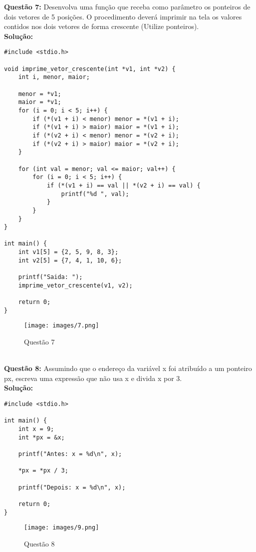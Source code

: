 \documentclass[12pt]{article}
\begin{document}
\textbf{Questão 7:} Desenvolva uma função que receba como parâmetro os ponteiros de
dois vetores de 5 posições. O procedimento deverá imprimir na tela os
valores contidos nos dois vetores de forma crescente (Utilize ponteiros).
\\

\noindent\textbf{Solução:}
\begin{lstlisting}[style=c]
#include <stdio.h>

void imprime_vetor_crescente(int *v1, int *v2) {
    int i, menor, maior;

    menor = *v1;
    maior = *v1;
    for (i = 0; i < 5; i++) {
        if (*(v1 + i) < menor) menor = *(v1 + i);
        if (*(v1 + i) > maior) maior = *(v1 + i);
        if (*(v2 + i) < menor) menor = *(v2 + i);
        if (*(v2 + i) > maior) maior = *(v2 + i);
    }

    for (int val = menor; val <= maior; val++) {
        for (i = 0; i < 5; i++) {
            if (*(v1 + i) == val || *(v2 + i) == val) {
                printf("%d ", val);
            }
        }
    }
}

int main() {
    int v1[5] = {2, 5, 9, 8, 3};
    int v2[5] = {7, 4, 1, 10, 6};

    printf("Saida: ");
    imprime_vetor_crescente(v1, v2);

    return 0;
}
\end{lstlisting}

\begin{figure}[h]
    \centering
    \texttt{[image: images/7.png]}
    \caption{Questão 7}
\end{figure}
\\

\textbf{Questão 8:} Assumindo que o endereço da variável x foi atribuído a um ponteiro px,
escreva uma expressão que não usa x e divida x por 3.
\\

\noindent\textbf{Solução:} 
\begin{lstlisting}[style=c]
#include <stdio.h>

int main() {
    int x = 9;        
    int *px = &x;     

    printf("Antes: x = %d\n", x);

    *px = *px / 3;

    printf("Depois: x = %d\n", x);

    return 0;
}
\end{lstlisting}
\begin{figure}[h]
    \centering
    \texttt{[image: images/9.png]}
    \caption{Questão 8}
    \label{fig:placeholder}
\end{figure}
\\
\end{document}
